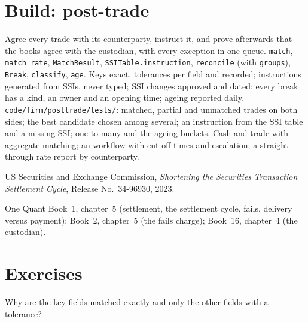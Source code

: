 \section{Build: post-trade}\label{bld:pl:post-trade-systems:posttrade}

\begin{build}
 Agree every trade with its counterparty, instruct it, and prove afterwards that the books agree with the custodian, with every
exception in one queue.
 \texttt{match}, \texttt{match\_rate}, \texttt{MatchResult}, \texttt{SSITable.instruction}, \texttt{reconcile} (with
\texttt{groups}), \texttt{Break}, \texttt{classify}, \texttt{age}.
 Keys exact, tolerances per field and recorded; instructions generated from SSIs, never typed; SSI changes approved and dated;
every break has a kind, an owner and an opening time; ageing reported daily.
 \texttt{code/firm/posttrade/tests/}: matched, partial and unmatched trades on both sides; the best candidate chosen
among several; an instruction from the SSI table and a missing SSI; one-to-many  and the ageing buckets.
 Cash and trade  with aggregate matching; an  workflow with cut-off times and escalation; a
straight-through rate report by counterparty.
\end{build}

\begin{omsources}
\item US Securities and Exchange Commission, \emph{Shortening the Securities Transaction Settlement Cycle}, Release No.~34-96930, 2023.
\item One Quant Book~1, chapter~5 (settlement, the settlement cycle, fails, delivery versus payment); Book~2, chapter~5 (the fails charge);
Book~16, chapter~4 (the custodian).
\end{omsources}

\section{Exercises}

\begin{exercise}[$\star$]\label{exo:pl:post-trade-systems:1}
Why are the key fields matched exactly and only the other fields with a tolerance?
\end{exercise}

